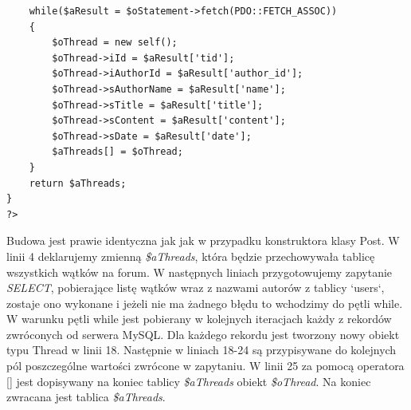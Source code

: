 \documentclass[a4paper,10pt]{article}
\begin{document}
\begin{verbatim}
	while($aResult = $oStatement->fetch(PDO::FETCH_ASSOC))
	{
		$oThread = new self();
		$oThread->iId = $aResult['tid'];
		$oThread->iAuthorId = $aResult['author_id'];
		$oThread->sAuthorName = $aResult['name'];
		$oThread->sTitle = $aResult['title'];
		$oThread->sContent = $aResult['content'];
		$oThread->sDate = $aResult['date'];
		$aThreads[] = $oThread;
	}
	return $aThreads;
}
?>
\end{verbatim}
Budowa jest prawie identyczna jak jak w przypadku konstruktora klasy Post. W linii 4 deklarujemy zmienną \textit{\$aThreads}, która będzie przechowywała tablicę wszystkich wątków na forum. W następnych liniach przygotowujemy zapytanie \textit{SELECT}, pobierające listę wątków wraz z nazwami autorów z tablicy `users`, zostaje ono wykonane i jeżeli nie ma żadnego błędu to wchodzimy do pętli while. W warunku pętli while jest pobierany w kolejnych iteracjach każdy z rekordów zwróconych od serwera MySQL. Dla każdego rekordu jest tworzony nowy obiekt typu Thread w linii 18. Następnie w liniach 18-24 są przypisywane do kolejnych pól poszczególne wartości zwrócone w zapytaniu. W linii 25 za pomocą operatora [] jest dopisywany na koniec tablicy \textit{\$aThreads} obiekt \textit{\$oThread}. Na koniec zwracana jest tablica \textit{\$aThreads}.
\end{document}
